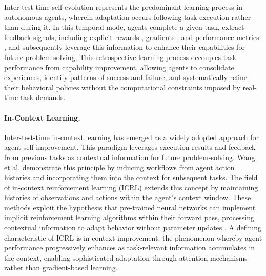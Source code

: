 Inter-test-time self-evolution represents the predominant learning process in autonomous agents, wherein adaptation occurs following task execution rather than during it. In this temporal mode, agents complete a given task, extract feedback signals, including explicit rewards \citep{gao2024designing}, gradients \citep{amari1993backpropagation, bottou2010large}, and performance metrics \citep{ge2023openagi}, and subsequently leverage this information to enhance their capabilities for future problem-solving. This retrospective learning process decouples task performance from capability improvement, allowing agents to consolidate experiences, identify patterns of success and failure, and systematically refine their behavioral policies without the computational constraints imposed by real-time task demands.

\paragraph{In-Context Learning.} Inter-test-time in-context learning has emerged as a widely adopted approach for agent self-improvement. This paradigm leverages execution results and feedback from previous tasks as contextual information for future problem-solving. Wang et al. \citep{wang2024agent} demonstrate this principle by inducing workflows from agent action histories and incorporating them into the context for subsequent tasks. The field of in-context reinforcement learning (ICRL) \citep{moeini2025survey, laskin2022context, lee2023supervised} extends this concept by maintaining histories of observations and actions within the agent's context window. These methods exploit the hypothesis that pre-trained neural networks can implement implicit reinforcement learning algorithms within their forward pass, processing contextual information to adapt behavior without parameter updates \citep{kirsch2023towards}. A defining characteristic of ICRL is in-context improvement: the phenomenon whereby agent performance progressively enhances as task-relevant information accumulates in the context, enabling sophisticated adaptation through attention mechanisms rather than gradient-based learning.


